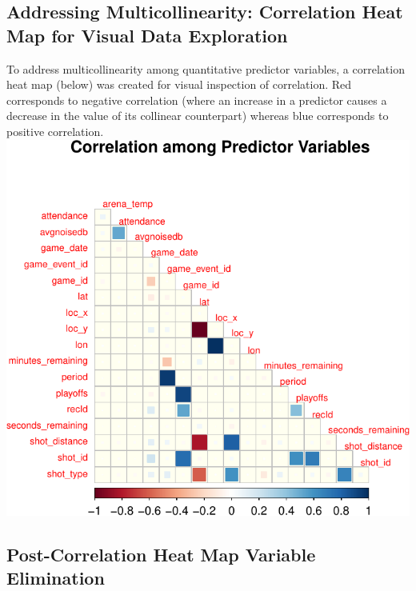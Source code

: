 \documentclass[american,]{article}
\begin{document}
\hypertarget{addressing-multicollinearity-correlation-heat-map-for-visual-data-exploration}{%
\subsection{\texorpdfstring{\textbf{Addressing Multicollinearity: Correlation Heat Map for Visual Data Exploration}}{Addressing Multicollinearity: Correlation Heat Map for Visual Data Exploration}}\label{addressing-multicollinearity-correlation-heat-map-for-visual-data-exploration}}

To address multicollinearity among quantitative predictor variables, a correlation heat map (below) was created for visual inspection of correlation. Red corresponds to negative correlation (where an increase in a predictor causes a decrease in the value of its collinear counterpart) whereas blue corresponds to positive correlation.
\includegraphics{Final_Project_Applied_files/figure-latex/Multicollinearity-1.pdf}

\hypertarget{post-correlation-heat-map-variable-elimination}{%
\subsection{\texorpdfstring{\textbf{Post-Correlation Heat Map Variable Elimination}}{Post-Correlation Heat Map Variable Elimination}}\label{post-correlation-heat-map-variable-elimination}}
\end{document}
